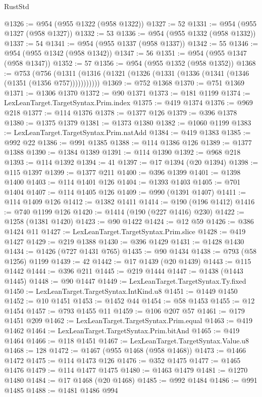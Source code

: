 \begin{lexlean}{RustStd}
\begin{coremodule}
@1326 := @954 (@955 @1322 (@958 @1322))
@1327 := 52
@1331 := @954 (@955 @1327 (@958 @1327))
@1332 := 53
@1336 := @954 (@955 @1332 (@958 @1332))
@1337 := 54
@1341 := @954 (@955 @1337 (@958 @1337))
@1342 := 55
@1346 := @954 (@955 @1342 (@958 @1342))
@1347 := 56
@1351 := @954 (@955 @1347 (@958 @1347))
@1352 := 57
@1356 := @954 (@955 @1352 (@958 @1352))
@1368 := @753
    (@756 (@1311 (@1316 (@1321 (@1326 (@1331 (@1336 (@1341 (@1346 (@1351 (@1356 @757)))))))))))
@1369 := @752 @1368
@1370 := @751 @1369
@1371 := @1306 @1370
@1372 := @90 @1371
@1373 := @181 @1199
@1374 := LexLeanTarget.TargetSyntax.Prim.index
@1375 := @419 @1374
@1376 := @969 @218
@1377 := @114 @1376
@1378 := @1377 @126
@1379 := @396 @1378
@1380 := @1375 @1379
@1381 := @1373 @1380
@1382 := @1060 @1199
@1383 := LexLeanTarget.TargetSyntax.Prim.natAdd
@1384 := @419 @1383
@1385 := @992 @22
@1386 := @991 @1385
@1388 := @114 @1386 @126
@1389 := @1377 @1388
@1390 := @1384 @1389
@1391 := @114 @1390
@1392 := @968 @218
@1393 := @114 @1392
@1394 := 41
@1397 := @17 @1394 (@20 @1394)
@1398 := @115 @1397
@1399 := @1377 @211
@1400 := @396 @1399
@1401 := @1398 @1400
@1403 := @114 @1401 @126
@1404 := @1393 @1403
@1405 := @701 @1404
@1407 := @114 @1405 @126
@1409 := @990 (@1391 @1407)
@1411 := @114 @1409 @126
@1412 := @1382 @1411
@1414 := @190 (@196 @1412)
@1416 := @740 @1199 @126
@1420 := @1414 (@190 (@227 @1416) @230)
@1422 := @1258 (@1381 @1420)
@1423 := @90 @1422
@1424 := @12 @59
@1426 := @386 @1424 @11
@1427 := LexLeanTarget.TargetSyntax.Prim.slice
@1428 := @419 @1427
@1429 := @219 @1388
@1430 := @396 @1429
@1431 := @1428 @1430
@1434 := @1426 (@727 @1431 @765)
@1435 := @90 @1434
@1438 := @793 (@58 @1256) @1199
@1439 := 42
@1442 := @17 @1439 (@20 @1439)
@1443 := @115 @1442
@1444 := @396 @211
@1445 := @219 @1444
@1447 := @1438 (@1443 @1445)
@1448 := @90 @1447
@1449 := LexLeanTarget.TargetSyntax.Ty.fixed
@1450 := LexLeanTarget.TargetSyntax.IntKind.u8
@1451 := @1449 @1450
@1452 := @10 @1451
@1453 := @1452 @44
@1454 := @58 @1453
@1455 := @12 @1454
@1457 := @793 @1455 @11
@1459 := @106 @207 @57
@1461 := @179 @1451 @209
@1462 := LexLeanTarget.TargetSyntax.Prim.equal
@1463 := @419 @1462
@1464 := LexLeanTarget.TargetSyntax.Prim.bitAnd
@1465 := @419 @1464
@1466 := @118 @1451
@1467 := LexLeanTarget.TargetSyntax.Value.u8
@1468 := 128
@1472 := @1467 (@955 @1468 (@958 @1468))
@1473 := @1466 @1472
@1475 := @114 @1473 @126
@1476 := @352 @1475
@1477 := @1465 @1476
@1479 := @114 @1477 @1475
@1480 := @1463 @1479
@1481 := @1270 @1480
@1484 := @17 @1468 (@20 @1468)
@1485 := @992 @1484
@1486 := @991 @1485
@1488 := @1481 @1486 @994

\end{coremodule}
\end{lexlean}

